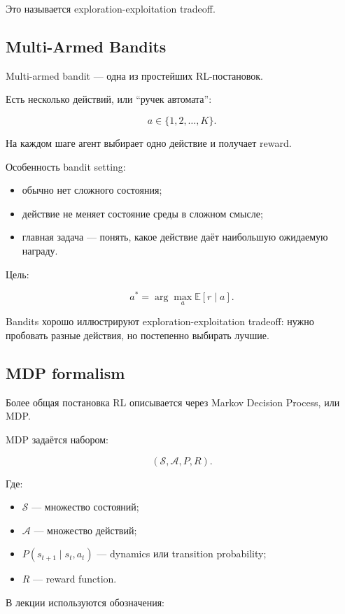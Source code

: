 \documentclass[a4paper,12pt]{article}
\begin{document}
Это называется exploration-exploitation tradeoff.

\subsection{Multi-Armed Bandits}

Multi-armed bandit --- одна из простейших RL-постановок.

Есть несколько действий, или ``ручек автомата'':

\[
a \in \{1,2,\dots,K\}.
\]

На каждом шаге агент выбирает одно действие и получает reward.

Особенность bandit setting:

\begin{itemize}
    \item обычно нет сложного состояния;
    \item действие не меняет состояние среды в сложном смысле;
    \item главная задача --- понять, какое действие даёт наибольшую ожидаемую награду.
\end{itemize}

Цель:

\[
a^*
=
\arg\max_a
\mathbb{E}[r \mid a].
\]

Bandits хорошо иллюстрируют exploration-exploitation tradeoff: нужно пробовать разные действия, но постепенно выбирать лучшие.

\subsection{MDP formalism}

Более общая постановка RL описывается через Markov Decision Process, или MDP.

MDP задаётся набором:

\[
(\mathcal{S}, \mathcal{A}, P, R).
\]

Где:

\begin{itemize}
    \item \(\mathcal{S}\) --- множество состояний;
    \item \(\mathcal{A}\) --- множество действий;
    \item \(P(s_{t+1} \mid s_t, a_t)\) --- dynamics или transition probability;
    \item \(R\) --- reward function.
\end{itemize}

В лекции используются обозначения:
\end{document}
